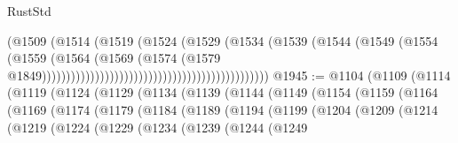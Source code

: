 \begin{lexlean}{RustStd}
\begin{coremodule}
{\begin{coremodule}
{{{{{{{{{{{{{{{{{{{{{{{{{{                                                                    (@1509
                                                                      (@1514
                                                                        (@1519
                                                                          (@1524
                                                                            (@1529
                                                                              (@1534
                                                                                (@1539
                                                                                  (@1544
                                                                                    (@1549
                                                                                      (@1554
                                                                                        (@1559
                                                                                          (@1564
                                                                                            (@1569
                                                                                              (@1574
                                                                                                (@1579
                                                                                                  @1849)))))))))))))))))))))))))))))))))))))))))))))))
@1945 := @1104
    (@1109
      (@1114
        (@1119
          (@1124
            (@1129
              (@1134
                (@1139
                  (@1144
                    (@1149
                      (@1154
                        (@1159
                          (@1164
                            (@1169
                              (@1174
                                (@1179
                                  (@1184
                                    (@1189
                                      (@1194
                                        (@1199
                                          (@1204
                                            (@1209
                                              (@1214
                                                (@1219
                                                  (@1224
                                                    (@1229
                                                      (@1234
                                                        (@1239
                                                          (@1244
                                                            (@1249
}}}}}}}}}}}}}}}}}}}}}}}}}}
\end{coremodule}}
\end{coremodule}
\end{lexlean}
